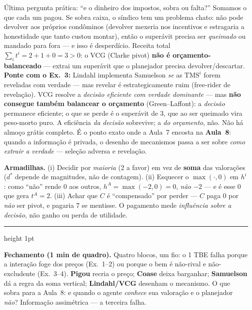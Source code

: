 \documentclass[11pt]{article}
\newcommand{\passo}[1]{\par\medskip\noindent{\bfseries\color{insperdark}#1}\par}
\newcommand{\TMS}{\text{TMS}}
\begin{document}
\passo{Passo 5 --- Saldo do mecanismo e ponte (e).}
Última pergunta prática: ``e o dinheiro dos impostos, sobra ou falta?'' Somamos o que cada um pagou. Se sobra
caixa, o síndico tem um problema chato: não pode devolver aos próprios condôminos (devolver mexeria nos
incentivos e estragaria a honestidade que tanto custou montar), então o superávit precisa ser \emph{queimado} ou
mandado para fora --- e isso é desperdício.
Receita total $\sum_i t^i=2+1+0=3>0$: o VCG (Clarke pivot) \textbf{não é orçamento-balanceado} ---
extrai um superávit que o planejador precisa devolver/descartar. \quad
\textbf{Ponte com o Ex.~3:} Lindahl implementa Samuelson \emph{se} as $\TMS^i$ forem reveladas com verdade ---
mas revelar é estrategicamente ruim (free-rider de revelação). VCG resolve a \emph{decisão eficiente com
verdade dominante} --- mas \textbf{não consegue também balancear o orçamento} (Green--Laffont): a
\emph{decisão} permanece eficiente; o que se perde é o superávit de $3$, que ao ser queimado vira peso-morto
puro. A eficiência \emph{da decisão} sobrevive; a \emph{do orçamento}, não. Não há almoço grátis completo. É o ponto exato onde a Aula~7
encosta na \textbf{Aula~8}: quando a informação é privada, o desenho de mecanismos passa a ser sobre
\emph{como extrair a verdade} --- seleção adversa e revelação.

\begin{armadbox}
\textbf{Armadilhas.} (i) Decidir por \emph{maioria} (2 a favor) em vez de \textbf{soma} das valorações
($d^*$ depende de magnitudes, não de contagem). (ii) Esquecer o $\max(\cdot,0)$ em $h^i$: como ``não'' rende
$0$ aos outros, $h^A=\max(-2,0)=0$, \emph{não} $-2$ --- e é esse $0$ que gera $t^A=2$. (iii) Achar que $C$ é
``compensado'' por perder --- $C$ paga $0$ por \emph{não} ser pivot, e pagaria $7$ se mentisse. O pagamento
mede \emph{influência sobre a decisão}, não ganho ou perda de utilidade.
\end{armadbox}

\bigskip
{\color{insperred!40}\hrule height 1pt}
\smallskip
\noindent\textbf{\color{insperred}Fechamento (1 min de quadro).} Quatro blocos, um fio: o 1\textordmasculine{} TBE
falha porque a interação foge dos preços (Ex.~1--2) ou porque o bem é não-rival e não-excludente (Ex.~3--4).
\textbf{Pigou} recria o preço; \textbf{Coase} deixa barganhar; \textbf{Samuelson} dá a regra da soma vertical;
\textbf{Lindahl/VCG} desenham o mecanismo. O que sobra para a Aula~8: e quando o agente \emph{conhece} sua
valoração e o planejador \emph{não}? Informação assimétrica --- a terceira falha.
\end{document}
